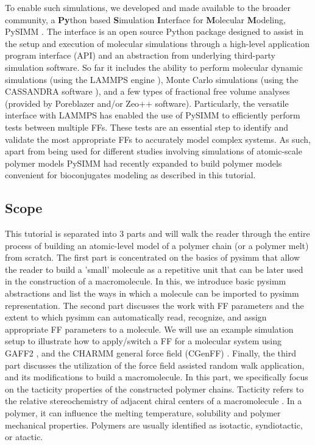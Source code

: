 \documentclass[9pt,tutorial]{livecoms}
\begin{document}
To enable such simulations, we developed and made available to the broader community, a \textbf{Py}thon based \textbf{S}imulation \textbf{I}nterface for \textbf{M}olecular \textbf{M}odeling, PySIMM \cite{pysimm_orig, pysimm_upd1, pysimm_upd2}. The interface is an open source Python package designed to assist in the setup and execution of molecular simulations through a high-level application program interface (API) and an abstraction from underlying third-party simulation software. So far it includes the ability to perform molecular dynamic simulations (using the LAMMPS engine \cite{lammps}), Monte Carlo simulations (using the CASSANDRA software \cite{cassandra}), and a few types of fractional free volume analyses (provided by Poreblazer \cite{pblazer} and/or Zeo++ \cite{zeopp} software). Particularly, the versatile interface with LAMMPS has enabled the use of PySIMM to efficiently perform tests between multiple FFs. These tests are an essential step to identify and validate the most appropriate FFs to accurately model complex systems. As such, apart from being used for different studies involving simulations of atomic-scale polymer models \cite{Rukmani2019_pegda, song2020, anstine2020effects} PySIMM had recently expanded \cite{pysimm_upd2} to build polymer models convenient for bioconjugates modeling as described in this tutorial. 

\subsection{Scope}

This tutorial is separated into 3 parts and will walk the reader through the entire process of building an atomic-level model of a polymer chain (or a polymer melt) from scratch. The first part is concentrated on the basics of pysimm that allow the reader to build a 'small' molecule as a repetitive unit that can be later used in the construction of a macromolecule. In this, we introduce basic pysimm abstractions and list the ways in which a molecule can be imported to pysimm representation. 
The second part discusses the work with FF parameters and the extent to which pysimm can automatically read, recognize, and assign appropriate FF parameters to a molecule. We will use an example simulation setup to illustrate how to apply/switch a FF for a molecular system using  GAFF2 \cite{gaff, amber_2016}, and the CHARMM general force field (CGenFF) \cite{vmslghe2010, vmslghe2012_1, vmslghe2012_2}. Finally, the third part discusses the utilization of the force field assisted random walk application, and its modifications to build a macromolecule. In this part, we specifically focus on the tacticity properties of the constructed polymer chains. 
Tacticity refers to the relative stereochemistry of adjacent chiral centers of a macromolecule \cite{young1991_pmers}. In a polymer, it can influence the melting temperature, solubility and polymer mechanical properties. Polymers are usually identified as isotactic, syndiotactic, or atactic.
\end{document}
